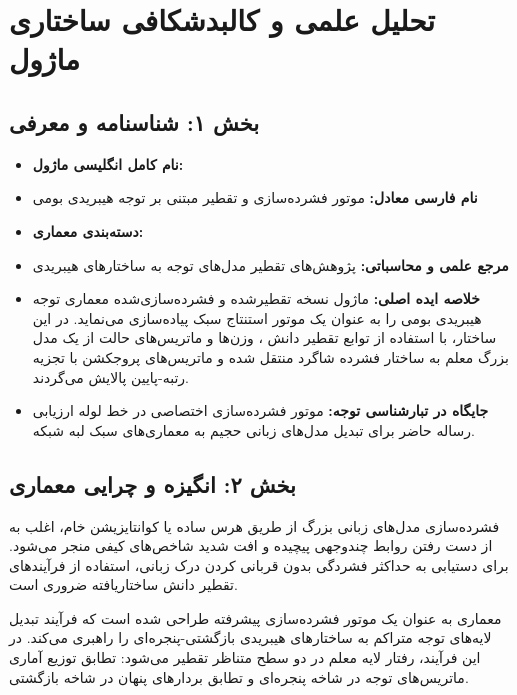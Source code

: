 \section{تحلیل علمی و کالبدشکافی ساختاری ماژول }
\label{sec:nha_compressor}

\subsection*{بخش ۱: شناسنامه و معرفی }
\begin{itemize}
    \item \textbf{نام کامل انگلیسی ماژول:} 
    \item \textbf{نام فارسی معادل:} موتور فشرده‌سازی و تقطیر مبتنی بر توجه هیبریدی بومی 
    \item \textbf{دسته‌بندی معماری:} 
    \item \textbf{مرجع علمی و محاسباتی:} پژوهش‌های تقطیر مدل‌های توجه به ساختارهای هیبریدی 
    \item \textbf{خلاصه ایده اصلی:} ماژول  نسخه تقطیرشده و فشرده‌سازی‌شده معماری توجه هیبریدی بومی را به عنوان یک موتور استنتاج سبک پیاده‌سازی می‌نماید. در این ساختار، با استفاده از توابع تقطیر دانش ، وزن‌ها و ماتریس‌های حالت از یک مدل بزرگ معلم به ساختار فشرده شاگرد منتقل شده و ماتریس‌های پروجکشن با تجزیه رتبه-پایین پالایش می‌گردند.
    \item \textbf{جایگاه در تبارشناسی توجه:} موتور فشرده‌سازی اختصاصی در خط لوله ارزیابی رساله حاضر برای تبدیل مدل‌های زبانی حجیم به معماری‌های سبک لبه شبکه.
\end{itemize}

\subsection*{بخش ۲: انگیزه و چرایی معماری }
فشرده‌سازی مدل‌های زبانی بزرگ از طریق هرس ساده یا کوانتایزیشن خام، اغلب به از دست رفتن روابط چندوجهی پیچیده و افت شدید شاخص‌های کیفی منجر می‌شود. برای دستیابی به حداکثر فشردگی بدون قربانی کردن درک زبانی، استفاده از فرآیندهای تقطیر دانش ساختاریافته ضروری است.

معماری  به عنوان یک موتور فشرده‌سازی پیشرفته طراحی شده است که فرآیند تبدیل لایه‌های توجه متراکم به ساختارهای هیبریدی بازگشتی-پنجره‌ای را راهبری می‌کند. در این فرآیند، رفتار لایه معلم در دو سطح متناظر تقطیر می‌شود: تطابق توزیع آماری ماتریس‌های توجه در شاخه پنجره‌ای و تطابق بردارهای پنهان در شاخه بازگشتی.

